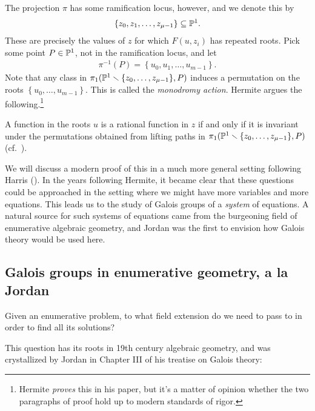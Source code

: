 \documentclass[11pt]{amsart}
\begin{document}
The projection $\pi$ has some ramification locus, however, and we denote this by
\begin{align*}
    \left\{ z_0, z_1, \ldots, z_{\mu-1} \right\} \subseteq \P^1.
\end{align*}
These are precisely the values of $z$ for which $F(u,z_i)$ has repeated roots. Pick some point $P \in \P^1$, not in the ramification locus, and let
\begin{align*}
    \pi^{-1}(P) = \left\{ u_0, u_1, \ldots, u_{m-1} \right\}.
\end{align*}
Note that any class in $\pi_1(\P^1\minus \{z_0, \ldots, z_{\mu-1}\},P)$ induces a permutation on the roots $\left\{ u_0, \ldots, u_{m-1} \right\}$. This is called the \textit{monodromy action}. Hermite argues the following.\footnote{Hermite \textit{proves} this in his paper, but it's a matter of opinion whether the two paragraphs of proof hold up to modern standards of rigor.}

\begin{theorem}
A function in the roots $u$ is a rational function in $z$ if and only if it is invariant under the permutations obtained from lifting paths in $\pi_1(\P^1\minus \{z_0, \ldots, z_{\mu-1}\},P)$ (cf.~\cite{Harris-Galois}).
\end{theorem}
We will discuss a modern proof of this in a much more general setting following Harris (). In the years following Hermite, it became clear that these questions could be approached in the setting where we might have more variables and more equations. This leads us to the study of Galois groups of a \textit{system} of equations. A natural source for such systems of equations came from the burgeoning field of enumerative algebraic geometry, and Jordan was the first to envision how Galois theory would be used here.

\subsection{Galois groups in enumerative geometry, a la Jordan}

\begin{question} Given an enumerative problem, to what field extension do we need to pass to in order to find all its solutions?
\end{question}

This question has its roots in 19th century algebraic geometry, and was crystallized by Jordan in Chapter III of his treatise on Galois theory:
\end{document}
